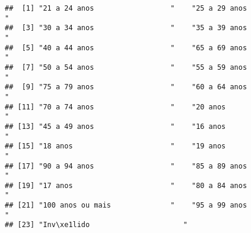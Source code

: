 \documentclass[
]{article}
\newenvironment{Shaded}{\begin{snugshade}}{\end{snugshade}}
\newcommand{\FunctionTok}[1]{\textcolor[rgb]{0.13,0.29,0.53}{\textbf{#1}}}
\newcommand{\NormalTok}[1]{#1}
\newcommand{\SpecialCharTok}[1]{\textcolor[rgb]{0.81,0.36,0.00}{\textbf{#1}}}
\begin{document}
\begin{verbatim}
##  [1] "21 a 24 anos                  "    "25 a 29 anos                  "   
##  [3] "30 a 34 anos                  "    "35 a 39 anos                  "   
##  [5] "40 a 44 anos                  "    "65 a 69 anos                  "   
##  [7] "50 a 54 anos                  "    "55 a 59 anos                  "   
##  [9] "75 a 79 anos                  "    "60 a 64 anos                  "   
## [11] "70 a 74 anos                  "    "20 anos                       "   
## [13] "45 a 49 anos                  "    "16 anos                       "   
## [15] "18 anos                       "    "19 anos                       "   
## [17] "90 a 94 anos                  "    "85 a 89 anos                  "   
## [19] "17 anos                       "    "80 a 84 anos                  "   
## [21] "100 anos ou mais              "    "95 a 99 anos                  "   
## [23] "Inv\xe1lido                      "
\end{verbatim}

\begin{Shaded}
\end{Shaded}
\end{document}

